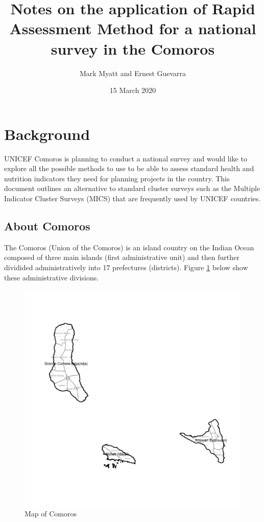 \documentclass[12pt,a4paper]{article}
\title{\vspace{8cm} \LARGE{Notes on the application of Rapid Assessment Method for a national survey in the Comoros}}
\author{Mark Myatt and Ernest Guevarra}
\date{15 March 2020}
\begin{document}
\maketitle

\newpage

\newpage

\hypertarget{background}{%
\section{Background}\label{background}}

UNICEF Comoros is planning to conduct a national survey and would like to explore all the possible methods to use to be able to assess standard health and nutrition indicators they need for planning projects in the country. This document outlines an alternative to standard cluster surveys such as the Multiple Indicator Cluster Surveys (MICS) that are frequently used by UNICEF countries.

\hypertarget{about-comoros}{%
\subsection{About Comoros}\label{about-comoros}}

The Comoros (Union of the Comoros) is an island country on the Indian Ocean composed of three main islands (first administrative unit) and then further dividided administratively into 17 prefectures (districts). Figure \ref{fig:comorosMap} below show these administrative divisions.

\begin{figure}[H]

{\centering \includegraphics[width=0.9\linewidth]{comorosNotes_files/figure-latex/comorosMap-1} 

}

\caption{Map of Comoros}\label{fig:comorosMap}
\end{figure}
\end{document}
